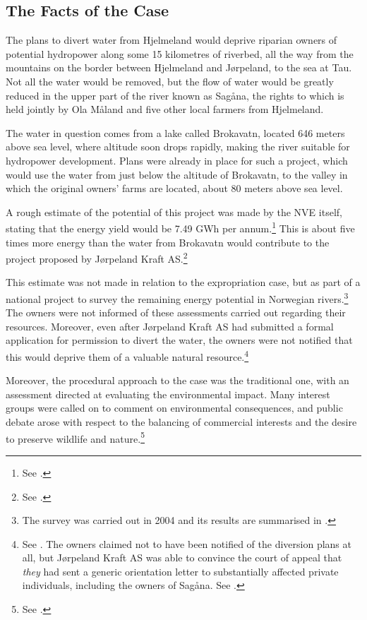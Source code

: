 \subsection{The Facts of the Case}\label{sec:5:6:1}

The plans to divert water from Hjelmeland would deprive riparian owners of potential hydropower along some 15 kilometres of riverbed, all the way from the mountains on the border between Hjelmeland and Jørpeland, to the sea at Tau. Not all the water would be removed, but the flow of water would be greatly reduced in the upper part of the river known as Sagåna, the rights to which is held jointly by Ola Måland and five other local farmers from Hjelmeland.

The water in question comes from a lake called Brokavatn, located 646 meters above sea level, where altitude soon drops rapidly, making the river suitable for hydropower development. Plans were already in place for such a project, which would use the water from just below the altitude of Brokavatn, to the valley in which the original owners' farms are located, about 80 meters above sea level. 

A rough estimate of the potential of this project was made by the NVE itself, stating that the energy yield would be 7.49 GWh per annum.\footnote{See \cite[16]{jorpeland09}.} This is about five times more energy than the water from Brokavatn would contribute to the project proposed by Jørpeland Kraft AS.\footnote{See \cite[19]{jorpeland09}.}

This estimate was not made in relation to the expropriation case, but as part of a national project to survey the remaining energy potential in Norwegian rivers.\footnote{The survey was carried out in 2004 and its results are summarised in \cite{jensen04}.} The owners were not informed of these assessments carried out regarding their resources. Moreover, even after Jørpeland Kraft AS had submitted a formal application for permission to divert the water, the owners were not notified that this would deprive them of a valuable natural resource.\footnote{See \cite[16]{jorpeland09}. The owners claimed not to have been notified of the diversion plans at all, but Jørpeland Kraft AS was able to convince the court of appeal that {\it they} had sent a generic orientation letter to substantially affected private individuals, including the owners of Sagåna. See \cite[5|8]{jorpeland11a}.}

Moreover, the procedural approach to the case was the traditional one, with an assessment directed at evaluating the environmental impact. Many interest groups were called on to comment on environmental consequences, and public debate arose with respect to the balancing of commercial interests and the desire to preserve wildlife and nature.\footnote{See \cite[19]{jorpeland09}.}

